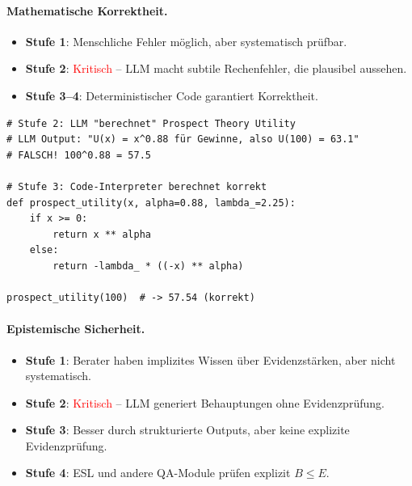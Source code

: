 \paragraph{Mathematische Korrektheit.}

\begin{itemize}
    \item \textbf{Stufe 1}: Menschliche Fehler möglich, aber systematisch prüfbar.
    \item \textbf{Stufe 2}: \textcolor{red}{Kritisch} -- LLM macht subtile Rechenfehler, die plausibel aussehen.
    \item \textbf{Stufe 3--4}: Deterministischer Code garantiert Korrektheit.
\end{itemize}

\begin{lstlisting}[caption={Beispiel: LLM-Rechenfehler vs. Code-Korrektheit}]
# Stufe 2: LLM "berechnet" Prospect Theory Utility
# LLM Output: "U(x) = x^0.88 für Gewinne, also U(100) = 63.1"
# FALSCH! 100^0.88 = 57.5

# Stufe 3: Code-Interpreter berechnet korrekt
def prospect_utility(x, alpha=0.88, lambda_=2.25):
    if x >= 0:
        return x ** alpha
    else:
        return -lambda_ * ((-x) ** alpha)

prospect_utility(100)  # -> 57.54 (korrekt)
\end{lstlisting}

\paragraph{Epistemische Sicherheit.}

\begin{itemize}
    \item \textbf{Stufe 1}: Berater haben implizites Wissen über Evidenzstärken, aber nicht systematisch.
    \item \textbf{Stufe 2}: \textcolor{red}{Kritisch} -- LLM generiert Behauptungen ohne Evidenzprüfung.
    \item \textbf{Stufe 3}: Besser durch strukturierte Outputs, aber keine explizite Evidenzprüfung.
    \item \textbf{Stufe 4}: ESL und andere QA-Module prüfen explizit $B \leq E$.
\end{itemize}

